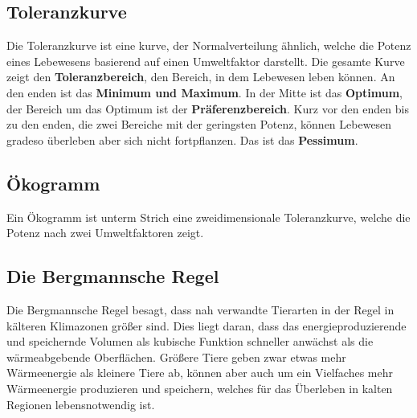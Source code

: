 \documentclass{article}
\begin{document}
\subsection{Toleranzkurve}
Die Toleranzkurve ist eine kurve, der Normalverteilung ähnlich, welche die Potenz eines Lebewesens basierend auf einen Umweltfaktor darstellt. Die gesamte Kurve zeigt den \textbf{Toleranzbereich}, den Bereich, in dem Lebewesen leben können. An den enden ist das \textbf{Minimum und Maximum}. In der Mitte ist das \textbf{Optimum}, der Bereich um das Optimum ist der \textbf{Präferenzbereich}. Kurz vor den enden bis zu den enden, die zwei Bereiche mit der geringsten Potenz, können Lebewesen gradeso überleben aber sich nicht fortpflanzen. Das ist das \textbf{Pessimum}.
  
\begin{figure}[h] 
  \centering
\end{figure} 
 
\subsection{Ökogramm}
Ein Ökogramm ist unterm Strich eine zweidimensionale Toleranzkurve, welche die Potenz nach zwei Umweltfaktoren zeigt.
 
\subsection{Die Bergmannsche Regel}
Die Bergmannsche Regel besagt, dass nah verwandte Tierarten in der Regel in kälteren Klimazonen größer sind. Dies liegt daran, dass das energieproduzierende und speichernde Volumen als kubische Funktion schneller anwächst als die wärmeabgebende Oberflächen. Größere Tiere geben zwar etwas mehr Wärmeenergie als kleinere Tiere ab, können aber auch um ein Vielfaches mehr Wärmeenergie produzieren und speichern, welches für das Überleben in kalten Regionen lebensnotwendig ist.
 
\end{document}
